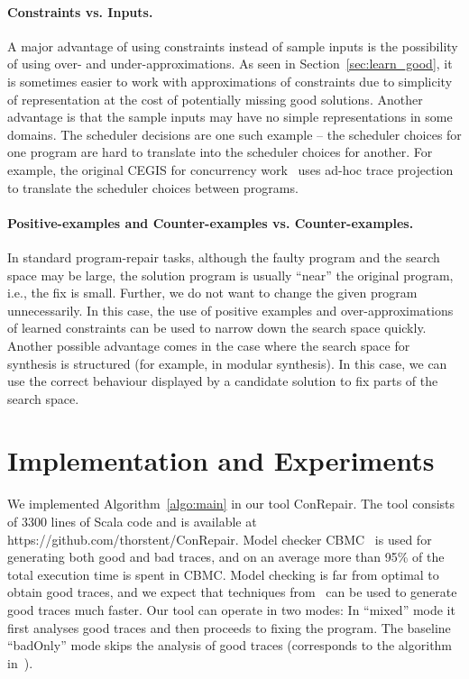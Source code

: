 \documentclass{llncs}
\begin{document}
\vspace{-1ex}
\paragraph{Constraints vs. Inputs.}
A major advantage of using constraints instead of sample inputs is the
possibility of using over- and under-approximations.
As seen in Section~\ref{sec:learn_good}, it is sometimes easier
to work with approximations of constraints due to simplicity
of representation at the cost of potentially missing good solutions.
Another advantage is that the sample inputs may have no simple
representations in some domains. 
The scheduler decisions are one such example -- the
scheduler choices for one program are hard to translate into the
scheduler choices for another.
For example, the original CEGIS for concurrency work~\cite{SLJB08} uses 
ad-hoc trace projection to translate the scheduler choices
between programs.


\vspace{-1ex}
\paragraph{Positive-examples and Counter-examples vs. Counter-examples.}
In standard program-repair tasks, although the faulty
program and the search space  may be large, the
solution program is usually ``near'' the original program, i.e., the fix
is small.
Further, we do not want to change the given program unnecessarily. 
In this case, the use of positive examples and over-approximations of
learned constraints can be used to narrow down the search space quickly.
Another possible advantage comes in the case where the search space
for synthesis is structured (for example, in modular synthesis).
In this case, we can use the correct behaviour displayed by a candidate
solution to fix parts of the search space.


\section{Implementation and Experiments}
\label{sec:impl}

We implemented Algorithm~\ref{algo:main} in our tool ConRepair.
The tool consists of 3300 lines of Scala code and is available at
https://github.com/thorstent/ConRepair.
Model checker CBMC~\cite{cbmc} is used for generating both good and bad
traces, and on an average more than 95\% of the total execution time is
spent in CBMC.
Model checking is far from optimal to obtain good traces, and we expect
that techniques from~\cite{Sen:2008:RDR:1375581.1375584} can be used to
generate good traces much faster.
Our tool can operate in two modes: In ``mixed'' mode it first
analyses good traces and then proceeds to fixing the program. 
The baseline ``badOnly'' mode skips the analysis of good traces
(corresponds to the algorithm in~\cite{cav2013}).
\end{document}
